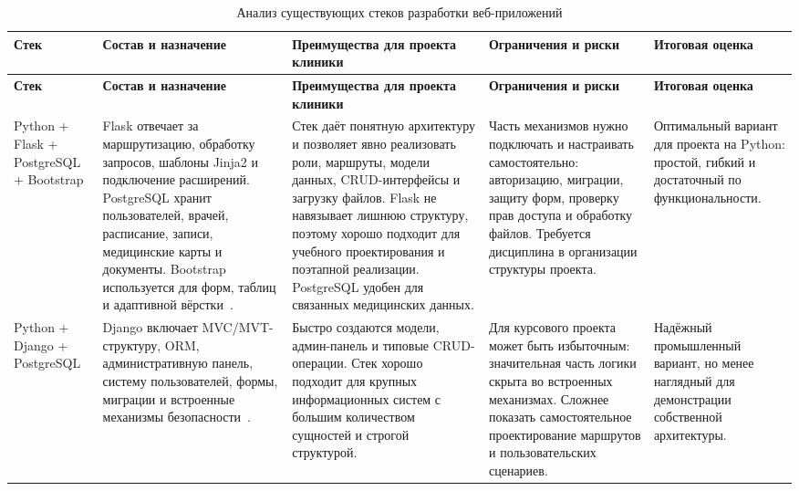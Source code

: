 {\scriptsize
\sloppy
\setlength{\LTcapwidth}{\textwidth}
\setlength{\tabcolsep}{2pt}
\renewcommand{\arraystretch}{1.12}
\begin{longtable}{|>{\raggedright\arraybackslash}p{}|>{\raggedright\arraybackslash}p{}|>{\raggedright\arraybackslash}p{}|>{\raggedright\arraybackslash}p{}|>{\raggedright\arraybackslash}p{}|}
\caption{Анализ существующих стеков разработки веб-приложений}\label{tab:stack_analysis}\\
\hline
\textbf{Стек} & \textbf{Состав и назначение} & \textbf{Преимущества для проекта клиники} & \textbf{Ограничения и риски} & \textbf{Итоговая оценка} \\ \hline
\endfirsthead
\tabcont{\ref{tab:stack_analysis}}
\textbf{Стек} & \textbf{Состав и назначение} & \textbf{Преимущества для проекта клиники} & \textbf{Ограничения и риски} & \textbf{Итоговая оценка} \\ \hline
\endhead
Python + Flask + PostgreSQL + Bootstrap & Flask отвечает за маршрутизацию, обработку запросов, шаблоны Jinja2 и подключение расширений. PostgreSQL хранит пользователей, врачей, расписание, записи, медицинские карты и документы. Bootstrap используется для форм, таблиц и адаптивной вёрстки~\cite{python_docs,flask_docs,postgres_docs,bootstrap_docs}. & Стек даёт понятную архитектуру и позволяет явно реализовать роли, маршруты, модели данных, CRUD-интерфейсы и загрузку файлов. Flask не навязывает лишнюю структуру, поэтому хорошо подходит для учебного проектирования и поэтапной реализации. PostgreSQL удобен для связанных медицинских данных. & Часть механизмов нужно подключать и настраивать самостоятельно: авторизацию, миграции, защиту форм, проверку прав доступа и обработку файлов. Требуется дисциплина в организации структуры проекта. & Оптимальный вариант для проекта на Python: простой, гибкий и достаточный по функциональности. \\ \hline
Python + Django + PostgreSQL & Django включает MVC/MVT-структуру, ORM, административную панель, систему пользователей, формы, миграции и встроенные механизмы безопасности~\cite{django_docs}. & Быстро создаются модели, админ-панель и типовые CRUD-операции. Стек хорошо подходит для крупных информационных систем с большим количеством сущностей и строгой структурой. & Для курсового проекта может быть избыточным: значительная часть логики скрыта во встроенных механизмах. Сложнее показать самостоятельное проектирование маршрутов и пользовательских сценариев. & Надёжный промышленный вариант, но менее наглядный для демонстрации собственной архитектуры. \\ \hline

\end{longtable}}
